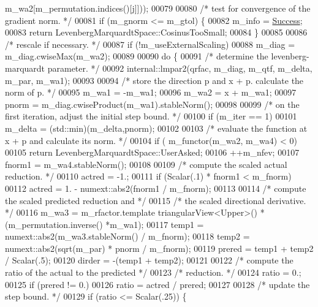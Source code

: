 \begin{DoxyCode}
      m\_wa2[m\_permutation.indices()[j]]));
00079 
00080   \textcolor{comment}{/* test for convergence of the gradient norm. */}
00081   \textcolor{keywordflow}{if} (m\_gnorm <= m\_gtol) \{
00082     m\_info = \hyperlink{group__enums_gga85fad7b87587764e5cf6b513a9e0ee5ea52581b035f4b59c203b8ff999ef5fcea}{Success};
00083     \textcolor{keywordflow}{return} LevenbergMarquardtSpace::CosinusTooSmall;
00084   \}
00085 
00086   \textcolor{comment}{/* rescale if necessary. */}
00087   \textcolor{keywordflow}{if} (!m\_useExternalScaling)
00088       m\_diag = m\_diag.cwiseMax(m\_wa2);
00089 
00090   \textcolor{keywordflow}{do} \{
00091     \textcolor{comment}{/* determine the levenberg-marquardt parameter. */}
00092     internal::lmpar2(qrfac, m\_diag, m\_qtf, m\_delta, m\_par, m\_wa1);
00093 
00094     \textcolor{comment}{/* store the direction p and x + p. calculate the norm of p. */}
00095     m\_wa1 = -m\_wa1;
00096     m\_wa2 = x + m\_wa1;
00097     pnorm = m\_diag.cwiseProduct(m\_wa1).stableNorm();
00098 
00099     \textcolor{comment}{/* on the first iteration, adjust the initial step bound. */}
00100     \textcolor{keywordflow}{if} (m\_iter == 1)
00101         m\_delta = (std::min)(m\_delta,pnorm);
00102 
00103     \textcolor{comment}{/* evaluate the function at x + p and calculate its norm. */}
00104     \textcolor{keywordflow}{if} ( m\_functor(m\_wa2, m\_wa4) < 0)
00105         \textcolor{keywordflow}{return} LevenbergMarquardtSpace::UserAsked;
00106     ++m\_nfev;
00107     fnorm1 = m\_wa4.stableNorm();
00108 
00109     \textcolor{comment}{/* compute the scaled actual reduction. */}
00110     actred = -1.;
00111     \textcolor{keywordflow}{if} (Scalar(.1) * fnorm1 < m\_fnorm)
00112         actred = 1. - numext::abs2(fnorm1 / m\_fnorm);
00113 
00114     \textcolor{comment}{/* compute the scaled predicted reduction and */}
00115     \textcolor{comment}{/* the scaled directional derivative. */}
00116     m\_wa3 = m\_rfactor.template triangularView<Upper>() * (m\_permutation.inverse() *m\_wa1);
00117     temp1 = numext::abs2(m\_wa3.stableNorm() / m\_fnorm);
00118     temp2 = numext::abs2(sqrt(m\_par) * pnorm / m\_fnorm);
00119     prered = temp1 + temp2 / Scalar(.5);
00120     dirder = -(temp1 + temp2);
00121 
00122     \textcolor{comment}{/* compute the ratio of the actual to the predicted */}
00123     \textcolor{comment}{/* reduction. */}
00124     ratio = 0.;
00125     \textcolor{keywordflow}{if} (prered != 0.)
00126         ratio = actred / prered;
00127 
00128     \textcolor{comment}{/* update the step bound. */}
00129     \textcolor{keywordflow}{if} (ratio <= Scalar(.25)) \{

\end{DoxyCode}
